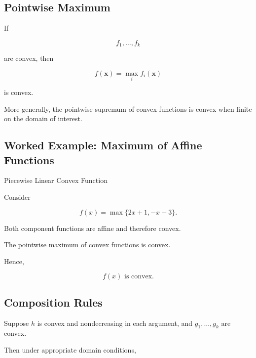 \subsection{Pointwise Maximum}
\label{subsec:pointwise-maximum-convex}

If

\[
f_1,\ldots,f_k
\]

are convex, then

\[
\boxed{
f(\mathbf{x})
=
\max_{i}
f_i(\mathbf{x})
}
\]

is convex.

More generally, the pointwise supremum of convex functions is convex when
finite on the domain of interest.

\subsection{Worked Example: Maximum of Affine Functions}
\label{subsec:worked-max-affine-convex}

\begin{workedexamplebox}{Piecewise Linear Convex Function}

Consider

\[
f(x)
=
\max
\{
2x+1,
-x+3
\}.
\]

Both component functions are affine and therefore convex.

The pointwise maximum of convex functions is convex.

Hence,

\begin{answerbox}
\[
\boxed{
f(x)
\text{ is convex}.
}
\]
\end{answerbox}

\end{workedexamplebox}

\subsection{Composition Rules}
\label{subsec:convex-composition-rules}

Suppose \(h\) is convex and nondecreasing in each argument, and
\(g_1,\ldots,g_k\) are convex.

Then under appropriate domain conditions,

